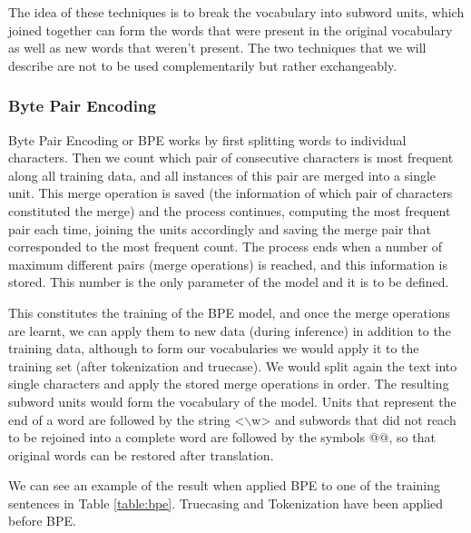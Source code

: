 \documentclass[11pt,english,listoffigures,listoftables]{tfgetsinf}
\begin{document}
The idea of these techniques is to break the vocabulary into subword units, which joined together can form the words that were present in the original vocabulary as well as new words that weren't present. The two techniques that we will describe are not to be used complementarily but rather exchangeably.

\subsubsection{Byte Pair Encoding}
Byte Pair Encoding or BPE \cite{DBLP:journals/corr/SennrichHB15} \cite{10.5555/177910.177914} works by first splitting words to individual characters. Then we count which pair of consecutive characters is most frequent along all training data, and all instances of this pair are merged into a single unit. This merge operation is saved (the information of which pair of characters constituted the merge) and the process continues, computing the most frequent pair each time, joining the units accordingly and saving the merge pair that corresponded to the most frequent count. The process ends when a number of maximum different pairs (merge operations) is reached, and this information is stored. This number is the only parameter of the model and it is to be defined.

This constitutes the training of the BPE model, and once the merge operations are learnt, we can apply them to new data (during inference) in addition to the training data, although to form our vocabularies we would apply it to the training set (after tokenization and truecase).
We would split again the text into single characters and apply the stored merge operations in order. The resulting subword units would form the vocabulary of the model. Units that represent the end of a word are followed by the string <$\backslash$w> and subwords that did not reach to be rejoined into a complete word are followed by the symbols @@, so that original words can be restored after translation.

We can see an example of the result when applied BPE to one of the training sentences in Table \ref{table:bpe}. Truecasing and Tokenization have been applied before BPE.
\end{document}
